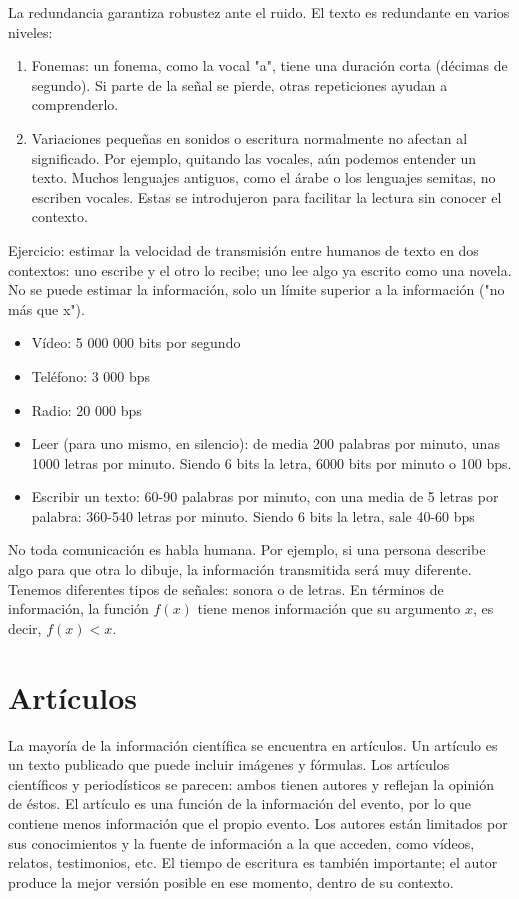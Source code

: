 La redundancia garantiza robustez ante el ruido. El texto es redundante en varios niveles:
\begin{enumerate}
\item Fonemas: un fonema, como la vocal "a", tiene una duración corta (décimas de segundo). Si parte de la señal se pierde, otras repeticiones ayudan a comprenderlo.
\item Variaciones pequeñas en sonidos o escritura normalmente no afectan al significado. Por ejemplo, quitando las vocales, aún podemos entender un texto. Muchos lenguajes antiguos, como el árabe﻿ o los lenguajes semitas, no escriben vocales. Estas se introdujeron para facilitar la lectura sin conocer el contexto.
 \end{enumerate}

Ejercicio: estimar la velocidad de transmisión entre humanos de texto en dos contextos: uno escribe y el otro lo recibe; uno lee algo ya escrito como una novela. No se puede estimar la información, solo un límite superior a la información ("no más que x"). %
\begin{itemize}
 \item Vídeo: 5 000 000 bits por segundo
 \item Teléfono: 3 000 bps
 \item Radio: 20 000 bps
 \item Leer (para uno mismo, en silencio): de media 200 palabras por minuto, unas 1000 letras por minuto. Siendo 6 bits la letra, 6000 bits por minuto o 100 bps.
 \item Escribir un texto: 60-90 palabras por minuto, con una media de 5 letras por palabra: 360-540 letras por minuto. Siendo 6 bits la letra, sale 40-60 bps
\end{itemize}

No toda comunicación es habla humana. Por ejemplo, si una persona describe algo para que otra lo dibuje, la información transmitida será muy diferente.
Tenemos diferentes tipos de señales: sonora o de letras. En términos de información, la función $f(x)$ tiene menos información que su argumento $x$, es decir, $f(x) < x$. 

\section{Artículos}
La mayoría de la información científica se encuentra en artículos. Un artículo es un texto publicado que puede incluir imágenes y fórmulas. Los artículos científicos y periodísticos se parecen: ambos tienen autores y reflejan la opinión de éstos. El artículo es una función de la información del evento, por lo que contiene menos información que el propio evento. Los autores están limitados por sus conocimientos y la fuente de información a la que acceden, como vídeos, relatos, testimonios, etc. El tiempo de escritura es también importante; el autor produce la mejor versión posible en ese momento, dentro de su contexto.

